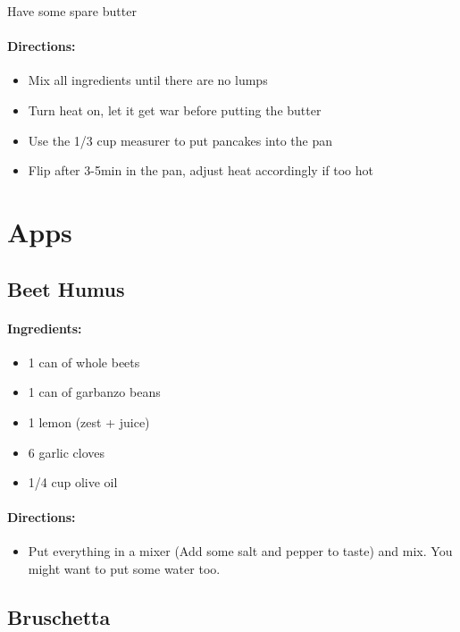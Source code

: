 \documentclass{article}
\begin{document}
Have some spare butter

\paragraph{Directions:}
\begin{itemize}
	\item Mix all ingredients until there are no lumps 
	\item Turn heat on, let it get war before putting the butter 
	\item Use the 1/3 cup measurer to put pancakes into the pan 
	\item Flip after 3-5min in the pan, adjust heat accordingly if too hot
\end{itemize}

\section{Apps}

\subsection{Beet Humus}

\paragraph{Ingredients:}

\begin{itemize}
	\item 1 can of whole beets
	\item 1 can of garbanzo beans
	\item 1 lemon (zest + juice)
	\item 6 garlic cloves
	\item 1/4 cup olive oil
\end{itemize}

\paragraph{Directions:}

\begin{itemize}
	\item Put everything in a mixer (Add some salt and pepper to taste) and mix. You might want to put some water too.
\end{itemize}

\subsection{Bruschetta}
\end{document}

